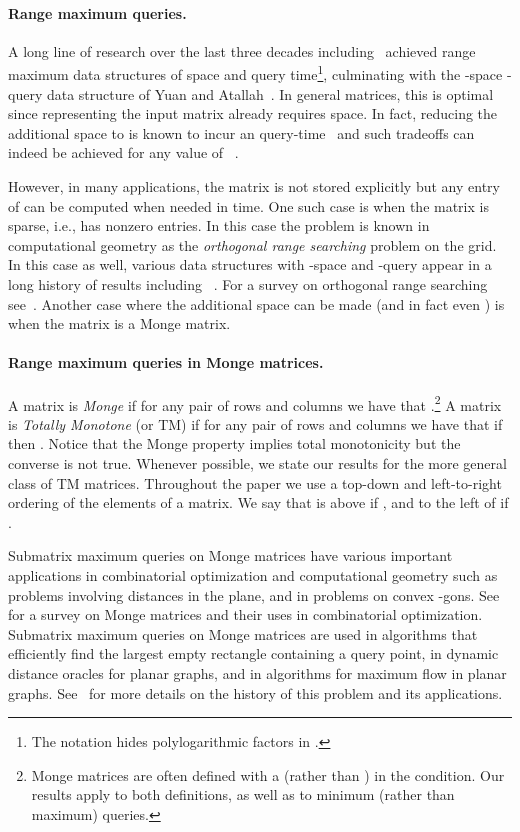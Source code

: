 \documentclass{llncs}
\begin{document}
\paragraph{\bf Range maximum queries.}
A long line of research over the last three decades including~\cite{AFL07,CR1989,DemaineLandauWeimann,GBT84,YuanA10} achieved range maximum data structures of  space and  query time\footnote{The  notation
  hides polylogarithmic factors in .}, culminating with the -space  -query data structure of Yuan and Atallah~\cite{YuanA10}. In general matrices, this is optimal since representing the input matrix already
requires  space. In fact, reducing the additional space to  is known to incur an  query-time~\cite{BrodalDR10} and such tradeoffs can indeed be achieved for any value of ~\cite{BrodalESA,BrodalDR10}. 

However, in many applications, the matrix  is not stored explicitly
but any entry of  can be computed when needed in  time. One
such case is when the matrix  is sparse, i.e.,  has 
  nonzero entries. In this case 
the problem is known in computational geometry as the {\em orthogonal range searching} problem  on the  grid. In this case as well, various data structures with -space and -query appear in a long history of results including
~\cite{AlstrupEtAl,Patrascu,Chazelle88,Munro,GBT84}. 
For a survey on orthogonal range searching see~\cite{Nekrich}. 
Another case where the additional space can be made  (and in fact even ) is when the matrix is a Monge matrix.

\paragraph{\bf  Range maximum queries in Monge matrices.}
A matrix  is {\em Monge} if for any pair of rows  and columns
 we have that .\footnote{Monge matrices are often defined with a 
  (rather than ) in the condition. Our results apply to both
  definitions, as well as to minimum (rather than maximum) queries.}
 A matrix  is {\em Totally Monotone} (or TM) if for any pair of
 rows  and columns  we have that if 
 then .  Notice that the Monge property
 implies total monotonicity but the converse is not true. Whenever
 possible, we state our results for the more general class of TM
 matrices. Throughout the paper we use a top-down and left-to-right ordering of the
 elements of a matrix. We say that  is above  if
 , and to the left  of  if .
 
Submatrix maximum queries on Monge matrices 
have various important applications in combinatorial optimization and computational
geometry 
such as problems involving distances in the plane, and in problems on
convex -gons. 
See~\cite{BKR96} for a survey on Monge matrices and their uses in combinatorial
optimization. Submatrix maximum queries on Monge matrices are
used in algorithms that efficiently find the largest empty rectangle containing a
query point, in dynamic distance oracles for planar graphs,
and in algorithms for maximum flow in planar graphs.
See~\cite{KaplanMozesNussbaumSharir} for more details on the
history of this problem and its applications.
\end{document}
